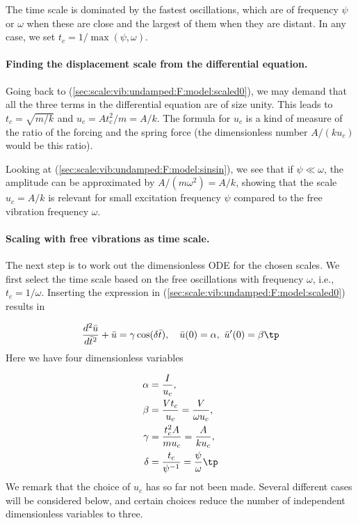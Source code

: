 \documentclass[graybox,envcountchap,sectrefs,final]{svmonodo}
\begin{document}
The time scale is dominated by the fastest oscillations, which are
of frequency $\psi$ or $\omega$ when these are close and the largest
of them when they are distant. In any case, we set
$t_c=1/\max(\psi,\omega)$.

\paragraph{Finding the displacement scale from the differential equation.}
Going back to (\ref{sec:scale:vib:undamped:F:model:scaled0}), we
may demand that all the three terms in the differential equation
are of size unity. This leads to $t_c=\sqrt{m/k}$
and $u_c=At_c^2/m = A/k$. The formula for $u_c$ is a kind of measure
of the ratio of the
forcing and the spring force (the dimensionless number
$A/(ku_c)$ would be this ratio).

Looking at (\ref{sec:scale:vib:undamped:F:model:sinsin}), we see
that if $\psi\ll\omega$, the amplitude can be approximated
by $A/(m\omega^2)=A/k$, showing that the scale $u_c=A/k$ is
relevant for small excitation frequency $\psi$ compared to
the free vibration frequency $\omega$.

\paragraph{Scaling with free vibrations as time scale.}
The next step is to work out the dimensionless ODE for the chosen scales.
We first select the time scale based on the free oscillations
with frequency $\omega$, i.e., $t_c=1/\omega$. Inserting the expression in
(\ref{sec:scale:vib:undamped:F:model:scaled0}) results in

\begin{equation}
\frac{d^2\bar u}{d\bar t^2} + \bar u =
\gamma
\cos(\delta\bar t),
\quad \bar u(0)=\alpha,\ \bar u'(0)=\beta\tp
\label{sec:scale:vib:undamped:F:model:scaled2}
\end{equation}
Here we have four dimensionless variables

\begin{align}
\alpha &= \frac{I}{u_c},\\ 
\beta  &= \frac{Vt_c}{u_c} = \frac{V}{\omega u_c},\\ 
\gamma &= \frac{t_c^2 A}{mu_c} = \frac{A}{ku_c},\\ 
\delta &= \frac{t_c}{\psi^{-1}} = \frac{\psi}{\omega}\tp
\end{align}
We remark that the choice of $u_c$ has so far not been made. Several
different cases will be considered below, and certain choices reduce
the number of independent dimensionless variables to three.
\end{document}
